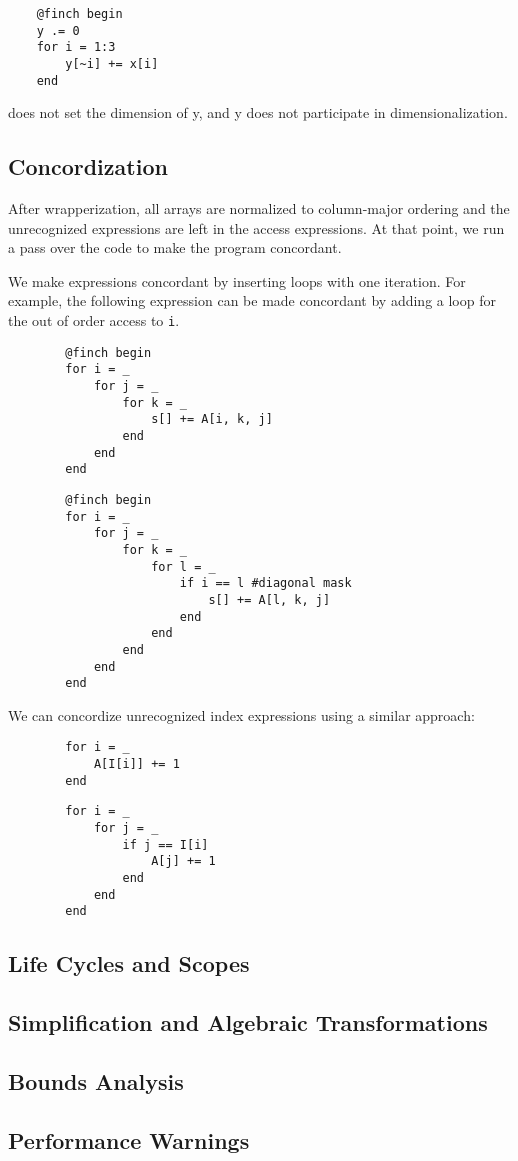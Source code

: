     \begin{verbatim}
    @finch begin
    y .= 0
    for i = 1:3
        y[~i] += x[i]
    end
    \end{verbatim}
    
    does not set the dimension of y, and y does not participate in dimensionalization.
    
\subsection{Concordization}
    After wrapperization, all arrays are normalized to column-major ordering and
    the unrecognized expressions are left in the access expressions. At that
    point, we run a pass over the code to make the program concordant.
    
    We make expressions concordant by inserting loops with one iteration. For example, the following expression can be made concordant by adding a loop for the out of order access to \texttt{i}.
    \begin{verbatim}
        @finch begin
        for i = _
            for j = _
                for k = _
                    s[] += A[i, k, j]
                end
            end
        end
    \end{verbatim}

    \begin{verbatim}
        @finch begin
        for i = _
            for j = _
                for k = _
                    for l = _
                        if i == l #diagonal mask
                            s[] += A[l, k, j]
                        end
                    end
                end
            end
        end
    \end{verbatim}

    We can concordize unrecognized index expressions using a similar approach:

    \begin{verbatim}
        for i = _
            A[I[i]] += 1
        end
    \end{verbatim}

    \begin{verbatim}
        for i = _
            for j = _
                if j == I[i]
                    A[j] += 1
                end
            end
        end
    \end{verbatim}

\subsection{Life Cycles and Scopes}

\subsection{Simplification and Algebraic Transformations}

\subsection{Bounds Analysis}

\subsection{Performance Warnings}

